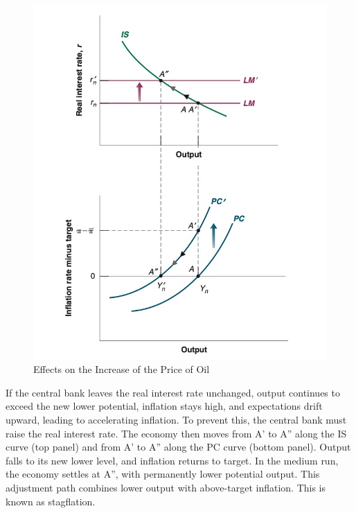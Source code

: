 \documentclass{extarticle}
\begin{document}
\begin{figure}[H]
    \centering 
    \includegraphics[width=0.45\linewidth]{stagflation.png}
    \caption{Effects on the Increase of the Price of Oil} 
    \label{fig:oil} 
\end{figure}


If the central bank leaves the real interest rate unchanged, output continues to exceed the new lower potential, inflation stays high, and expectations drift upward, leading to accelerating inflation. To prevent this, the central bank must raise the real interest rate. 
The economy then moves from A' to A'' along the IS curve (top panel) and from A' to A'' along the PC curve (bottom panel). Output falls to its new lower level, and inflation returns to target. In the medium run, the economy settles at A'', with permanently lower potential output. 
This adjustment path combines lower output with above-target inflation. This is known as stagflation.
\end{document}
